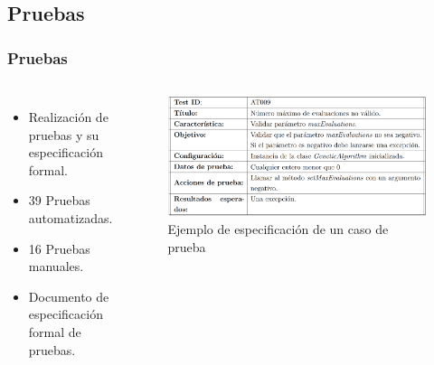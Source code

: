 \documentclass[9pt]{beamer}
\begin{document}
    \subsection{Pruebas}
    \begin{frame}
        \frametitle{Pruebas}                       
        
        \begin{columns}
            \begin{itemize}\justifying
                \item Realización de pruebas y su especificación formal.
                \item 39 Pruebas automatizadas.
                \item 16 Pruebas manuales.
                \item Documento de especificación formal de pruebas.
            \end{itemize}

            \begin{figure}
                \includegraphics[width=\textwidth]{assets/PruebaAutomatizada.png}
                \caption{Ejemplo de especificación de un caso de prueba}
            \end{figure}
        \end{columns}

    \end{frame}

        
\end{document}
